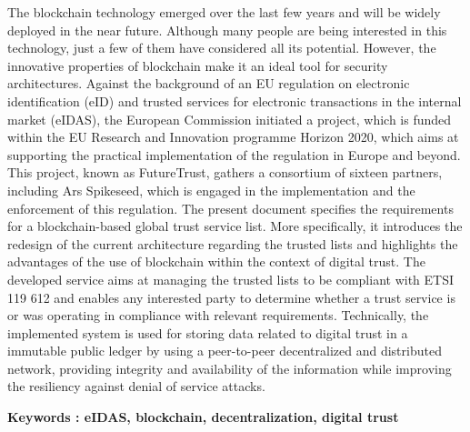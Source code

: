 \documentclass{tnreport}
\begin{document}
The blockchain technology emerged over the last few years and will be widely deployed in the near future.
Although many people are being interested in this technology, just a few of them have considered all its potential.
However, the innovative properties of blockchain make it an ideal tool for security architectures.
Against the background of an EU regulation on electronic identification (eID) and trusted services for electronic transactions in the internal market (eIDAS), the European Commission initiated a project, which is funded within the EU Research and Innovation programme Horizon 2020, which aims at supporting the practical implementation of the regulation in Europe and beyond.
This project, known as FutureTrust, gathers a consortium of sixteen partners, including Ar{\texteta}s Spikeseed, which is engaged in the implementation and the enforcement of this regulation.
The present document specifies the requirements for a blockchain-based global trust service list.
More specifically, it introduces the redesign of the current architecture regarding the trusted lists and highlights the advantages of the use of blockchain within the context of digital trust.
The developed service aims at managing the trusted lists to be compliant with ETSI 119 612 and enables any interested party to determine whether a trust service is or was operating in compliance with relevant requirements.
Technically, the implemented system is used for storing data related to digital trust in a immutable public ledger by using a peer-to-peer decentralized and distributed network, providing integrity and availability of the information while improving the resiliency against denial of service attacks.

{\bf Keywords : eIDAS, blockchain, decentralization, digital trust}
\end{document}
